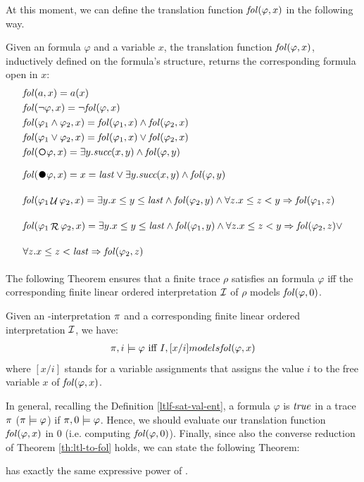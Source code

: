 At this moment, we can define the translation function $\mathit{fol}(\varphi,x)$ in the following way.
\begin{definition}\label{def:ltlf-to-fol}
Given an \LTLf formula $\varphi$ and a variable $x$, the translation function $\mathit{fol}(\varphi,x)$, inductively defined on the \LTLf formula's structure, returns the corresponding \FOL formula open in $x$:
\begin{align*}
&\fol(a,x) = a(x)\\
&\fol(\lnot \varphi, x) = \lnot \fol(\varphi, x)\\
&\fol(\varphi_1 \lAND \varphi_2,x) = \fol(\varphi_1,x) \lAND \fol(\varphi_2,x)\\
&\fol(\varphi_1 \lOR \varphi_2,x) = \fol(\varphi_1,x) \lOR \fol(\varphi_2,x)\\
&\fol(\Next \varphi, x) = \exists y.\suc(x,y) \lAND \fol(\varphi, y)\\
&\fol(\Wnext \varphi, x) = x= \last \lOR \exists y.\suc(x,y) \lAND \fol(\varphi, y)\\
&\fol(\varphi_1 \lUntil \varphi_2, x) = \exists y. x \le y \le \last \lAND \fol(\varphi_2, y) \lAND \forall z.x \le z < y \Rightarrow \fol(\varphi_1,z)\\
&\fol(\varphi_1 \Release \varphi_2, x) = \exists y. x \le y \le \last \lAND \fol(\varphi_1, y) \lAND \forall z.x \le z < y \Rightarrow \fol(\varphi_2,z)  \lOR\\
& \forall z.x \le z < \last \Rightarrow \fol(\varphi_2,z)
\end{align*}
\end{definition}
The following Theorem ensures that a finite trace $\rho$ satisfies an \LTLf formula $\varphi$ iff the corresponding finite linear ordered \FOL interpretation $\mathcal{I}$ of $\rho$ models $\mathit{fol}(\varphi, 0)$.
\begin{theorem}\citep{de2013linear}\label{th:ltl-to-fol}
Given an \LT-interpretation $\pi$ and a corresponding finite linear ordered \FOL interpretation $\mathcal{I}$, we have:
\begin{align*}
\pi,i \models \varphi \ \text{iff}\  I,[x/i] models \mathit{fol}(\varphi, x)
\end{align*}
where $[x/i]$ stands for a variable assignments that assigns the value $i$ to the free variable $x$ of $\mathit{fol}(\varphi, x)$.
\end{theorem}
In general, recalling the Definition \ref{ltlf-sat-val-ent}, a formula $\varphi$ is $\mathit{true}$ in a trace $\pi$ ($\pi \models \varphi$) if $\pi, 0 \models \varphi$. Hence, we should evaluate our translation function $\mathit{fol}(\varphi, x)$ in $0$ (i.e. computing $\mathit{fol}(\varphi, 0)$).
Finally, since also the converse reduction of Theorem \ref{th:ltl-to-fol} holds, we can state the following Theorem:
\begin{theorem}\citep{gabbay1980temporal}\label{th:ltl-fol-expressive}
\LTLf has exactly the same expressive power of \FOL.
\end{theorem}
